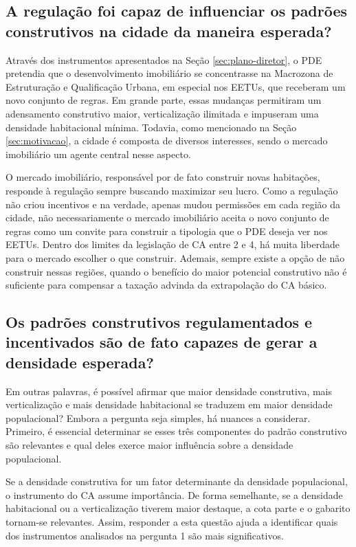 \subsection*{A regulação foi capaz de influenciar os padrões construtivos na cidade da maneira esperada?} 

Através dos instrumentos apresentados na Seção \ref{sec:plano-diretor}, o PDE pretendia que o desenvolvimento imobiliário se concentrasse na Macrozona de Estruturação e Qualificação Urbana, em especial nos EETUs, que receberam um novo conjunto de regras. Em grande parte, essas mudanças permitiram um adensamento construtivo maior, verticalização ilimitada e impuseram uma densidade habitacional mínima. Todavia, como mencionado na Seção \ref{sec:motivacao}, a cidade é composta de diversos interesses, sendo o mercado imobiliário um agente central nesse aspecto. 

O mercado imobiliário, responsável por de fato construir novas habitações, responde à regulação sempre buscando maximizar seu lucro. Como a regulação não criou incentivos e na verdade, apenas mudou permissões em cada região da cidade, não necessariamente o mercado imobiliário aceita o novo conjunto de regras como um convite para construir a tipologia que o PDE deseja ver nos EETUs. Dentro dos limites da legislação de CA entre 2 e 4, há muita liberdade para o mercado escolher o que construir. Ademais, sempre existe a opção de não construir nessas regiões, quando o benefício do maior potencial construtivo não é suficiente para compensar a taxação advinda da extrapolação do CA básico. 

\subsection*{Os padrões construtivos regulamentados e incentivados são de fato capazes de gerar a densidade esperada?} 

Em outras palavras, é possível afirmar que maior densidade construtiva, mais verticalização e mais densidade habitacional se traduzem em maior densidade populacional? Embora a pergunta seja simples, há nuances a considerar. Primeiro, é essencial determinar se esses três componentes do padrão construtivo são relevantes e qual deles exerce maior influência sobre a densidade populacional.

Se a densidade construtiva for um fator determinante da densidade populacional, o instrumento do CA assume importância. De forma semelhante, se a densidade habitacional ou a verticalização tiverem maior destaque, a cota parte e o gabarito tornam-se relevantes. Assim, responder a esta questão ajuda a identificar quais dos instrumentos analisados na pergunta 1 são mais significativos.

